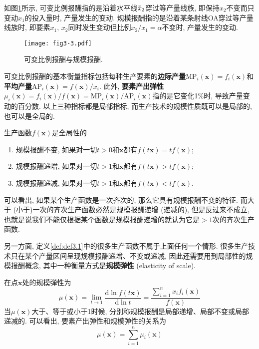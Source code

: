\documentclass[cn, 12pt, math=mtpro2, bibstyle=apa, blue]{elegantbook}
\newcommand{\x}{\mathbf{x}}
\newcommand{\overbar}[1]{\mkern 1.5mu\overline{\mkern-1.5mu#1\mkern-1.5mu}\mkern 1.5mu}
\begin{document}
如图\ref{fig3.3}所示, 可变比例报酬指的是沿着水平线$\overbar{x}_2$穿过等产量线族, 即保持$x_2$不变而只变动$x_1$的投入量时, 产量发生的变动. 规模报酬指的是沿着某条射线OA穿过等产量线族时, 即要素$x_1$, $x_2$同时发生变动但比例$x_2/x_1=\alpha$不变时, 产量发生的变动.

\begin{figure}[htbp!]
  \centering
  \texttt{[image: fig3-3.pdf]}
  \caption{可变比例报酬与规模报酬.}\label{fig3.3}
\end{figure}

可变比例报酬的基本衡量指标包括每种生产要素的\textbf{边际产量}$\text{MP}_i(\x)=f_i(\x)$和\textbf{平均产量}$\text{AP}_i(\x)=f(\x)/x_i$. 此外, \textbf{要素产出弹性}$\mu_i(\x)=f_i(\x)/f(\x)=\text{MP}_i(\x)/\text{AP}_i(\x)$指的是它变化1\%时, 导致产量变动的百分数. 以上三种指标都是局部指标, 而生产技术的规模性质既可以是局部的, 也可以是全局的.

\begin{definition}[全局性的规模报酬]
生产函数$f(\x)$是全局性的
\begin{enumerate}[label=\arabic*.]
  \item 规模报酬不变, 如果对一切$t>0$和$\x$都有$f(t\x)=tf(\x)$;
  \item 规模报酬递增, 如果对一切$t>1$和$\x$都有$f(t\x)>tf(\x)$;
  \item 规模报酬递减, 如果对一切$t>1$和$\x$都有$f(t\x)<tf(\x)$.
\end{enumerate}
\end{definition}

可以看出, 如果某个生产函数是一次齐次的, 那么它具有规模报酬不变的特征. 而大于 (小于)一次的齐次生产函数必然是规模报酬递增 (递减的), 但是反过来不成立, 也就是说我们不能仅根据某个函数是规模报酬递增的就认为它是$>1$次的齐次生产函数.

另一方面, 定义\ref{def:def3.1}中的很多生产函数不属于上面任何一个情形. 很多生产技术只在某个产量区间呈现规模报酬递增、不变或递减, 因此还需要用到局部性的规模报酬概念, 其中一种衡量方式是\textbf{规模弹性} (elasticity of scale).

\begin{definition}[局部性的规模报酬]
在点$\x$处的规模弹性为
$$\mu(\x)=\lim_{t\to1}\frac{\text{d}\ln f(t\x)}{\text{d}\ln t}=\frac{\sum_{i=1}^{n}x_if_i(\x)}{f(\x)}$$
当$\mu(\x)$大于、等于或小于1时候, 分别称规模报酬是局部递增、局部不变或局部递减的. 可以看出, 要素产出弹性和规模弹性的关系为
$$\mu(\x)=\sum_{i=1}^{n}\mu_i(\x)$$
\end{definition}
\end{document}
